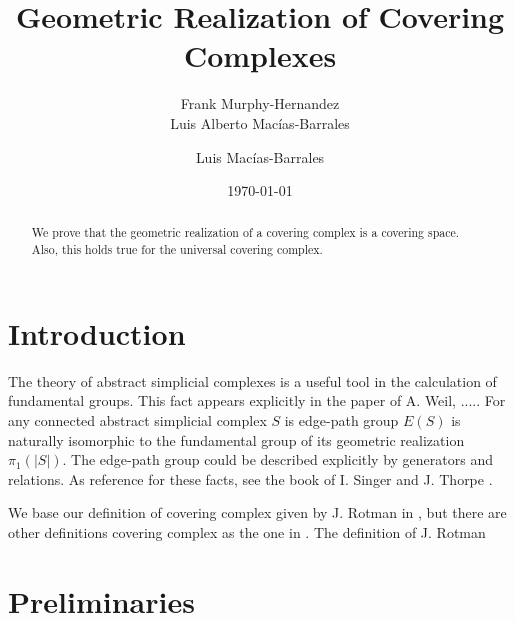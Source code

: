 \documentclass{amsart}
\begin{document}
\title{Geometric Realization of Covering Complexes}

\author{Frank Murphy-Hernandez\\Luis Alberto Mac\'ias-Barrales}
\address{Facultad de Ciencias, UNAM, Mexico City}

\author{Luis Mac\'ias-Barrales}
\address{Instituto de Matem\'aticas, UNAM, Mexico City}
\email{}


\date{\today}


\begin{abstract}
We prove that the geometric realization of a covering complex is a covering space. Also, this holds true for the universal covering complex.
\end{abstract}

\maketitle

\section*{Introduction}

The theory of abstract simplicial complexes is a useful tool in the calculation of fundamental groups. This fact appears explicitly in the paper \cite{weil1960discrete} of A. Weil, .....
For any connected abstract simplicial complex $S$ is edge-path group $E(S)$ is naturally isomorphic to the fundamental group of its geometric realization $\pi_1(\vert S\vert)$. The edge-path group could be described explicitly by  generators and relations. As reference for these facts, see the book of I. Singer and J. Thorpe \cite{singer2015lecture}.

We base our definition of covering complex given by J. Rotman in \cite{rotman1973covering}, but there are other definitions covering complex as the one in \cite{abello1991complexity}. The definition of J. Rotman

\section{Preliminaries}
\end{document}
